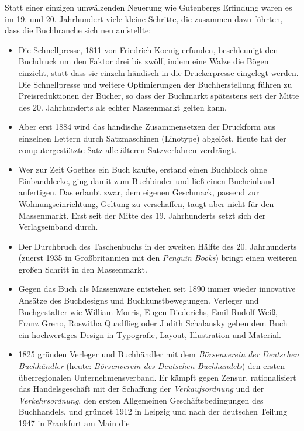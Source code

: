 \documentclass[a4paper,
fontsize=11pt,
oneside,
numbers=noperiodatend,
parskip=half-,
bibliography=totoc,
final
]{scrartcl}
\begin{document}
Statt einer einzigen umwälzenden Neuerung wie Gutenbergs Erfindung waren
es im 19. und 20. Jahrhundert viele kleine Schritte, die zusammen dazu
führten, dass die Buchbranche sich neu aufstellte:

\begin{itemize}
\item
  Die Schnellpresse, 1811 von Friedrich Koenig erfunden, beschleunigt
  den Buchdruck um den Faktor drei bis zwölf, indem eine Walze die Bögen
  einzieht, statt dass sie einzeln händisch in die Druckerpresse
  eingelegt werden. Die Schnellpresse und weitere Optimierungen der
  Buchherstellung führen zu Preisreduktionen der Bücher, so dass der
  Buchmarkt spätestens seit der Mitte des 20. Jahrhunderts als echter
  Massenmarkt gelten kann.
\item
  Aber erst 1884 wird das händische Zusammensetzen der Druckform aus
  einzelnen Lettern durch Satzmaschinen (Linotype) abgelöst. Heute hat
  der computergestützte Satz alle älteren Satzverfahren verdrängt.
\item
  Wer zur Zeit Goethes ein Buch kaufte, erstand einen Buchblock ohne
  Einbanddecke, ging damit zum Buchbinder und ließ einen Bucheinband
  anfertigen. Das erlaubt zwar, dem eigenen Geschmack, passend zur
  Wohnungseinrichtung, Geltung zu verschaffen, taugt aber nicht für den
  Massenmarkt. Erst seit der Mitte des 19. Jahrhunderts setzt sich der
  Verlagseinband durch.
\item
  Der Durchbruch des Taschenbuchs in der zweiten Hälfte des 20.
  Jahrhunderts (zuerst 1935 in Großbritannien mit den \emph{Penguin
  Books}) bringt einen weiteren großen Schritt in den Massenmarkt.
\item
  Gegen das Buch als Massenware entstehen seit 1890 immer wieder
  innovative Ansätze des Buchdesigns und Buchkunstbewegungen. Verleger
  und Buchgestalter wie William Morris, Eugen Diederichs, Emil Rudolf
  Weiß, Franz Greno, Roswitha Quadflieg oder Judith Schalansky geben dem
  Buch ein hochwertiges Design in Typografie, Layout, Illustration und
  Material.
\item
  1825 gründen Verleger und Buchhändler mit dem \emph{Börsenverein der
  Deutschen Buchhändler} (heute: \emph{Börsenverein des Deutschen
  Buchhandels}) den ersten überregionalen Unternehmensverband. Er kämpft
  gegen Zensur, rationalisiert das Handelsgeschäft mit der Schaffung der
  \emph{Verkaufsordnung} und der \emph{Verkehrsordnung}, den ersten
  Allgemeinen Geschäftsbedingungen des Buchhandels, und gründet 1912 in
  Leipzig und nach der deutschen Teilung 1947 in Frankfurt am Main die

\end{itemize}
\end{document}
